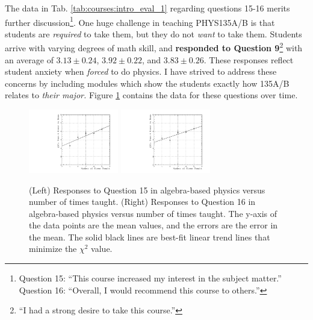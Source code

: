 \documentclass[../../main.tex]{subfiles}
\begin{document}
The data in Tab. \ref{tab:courses:intro_eval_1} regarding questions 15-16 merits further discussion\footnote{Question 15: ``This course increased my interest in the subject matter.'' Question 16: ``Overall, I would recommend this course to others.''}.  One huge challenge in teaching PHYS135A/B is that students are \textit{required} to take them, but they  do not \textit{want} to take them.  Students arrive with varying degrees of math skill, and \textbf{responded to Question 9}\footnote{``I had a strong desire to take this course.''} with an average of $3.13 \pm 0.24$, $3.92 \pm 0.22$, and $3.83 \pm 0.26$.  These responses reflect student anxiety when \textit{forced} to do physics.  I have strived to address these concerns by including modules which show the students exactly how 135A/B relates to \textit{their major.} Figure \ref{fig:courses:intro_q15} contains the data for these questions over time. \\ \hspace{0.1cm}

\begin{figure}[h]
\centering
\includegraphics[width=0.35\textwidth]{Q15_algebra_based.pdf}
\includegraphics[width=0.35\textwidth]{Q16_algebra_based.pdf}
\caption{\label{fig:courses:intro_q15}  (Left) Responses to Question 15 in algebra-based physics versus number of times taught. (Right) Responses to Question 16 in algebra-based physics versus number of times taught.  The y-axis of the data points are the mean values, and the errors are the error in the mean.  The solid black lines are best-fit linear trend lines that minimize the $\chi^2$ value.}
\end{figure}
\end{document}
